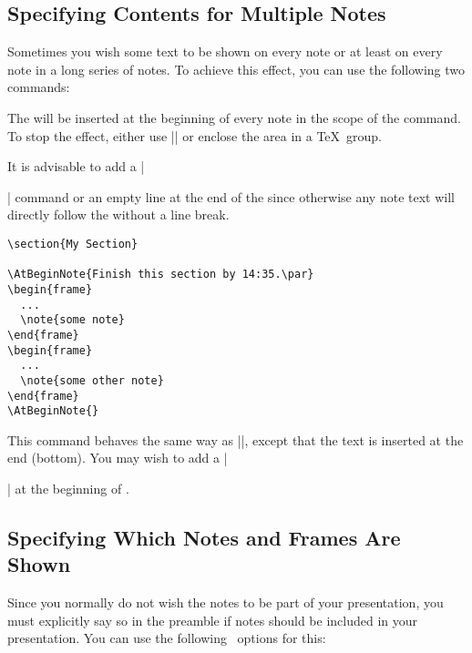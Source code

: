 \subsection{Specifying Contents for Multiple Notes}

Sometimes you wish some text to be shown on every note or at least on every note in a long series of notes. To achieve this effect, you can use the following two commands:

\begin{command}{\AtBeginNote{}}
  The  will be inserted at the beginning of every note in the scope of the command. To stop the effect, either use |\AtBeginNote{}| or enclose the area in a \TeX\ group.

  It is advisable to add a |\par| command or an empty line at the end of the  since otherwise any note text will directly follow the  without a line break.

  \example
\begin{verbatim}
\section{My Section}

\AtBeginNote{Finish this section by 14:35.\par}
\begin{frame}
  ...
  \note{some note}
\end{frame}
\begin{frame}
  ...
  \note{some other note}
\end{frame}
\AtBeginNote{}
\end{verbatim}
\end{command}

\begin{command}{\AtEndNote{}}
  This command behaves the same way as |\AtBeginNote|, except that the text is inserted at the end (bottom). You may wish to add a |\par| at the beginning of .
\end{command}


\subsection{Specifying Which Notes and Frames Are Shown}

Since you normally do not wish the notes to be part of your presentation, you must explicitly say so in the preamble if notes should be included in your presentation. You can use the following \beamer\ options for this:

